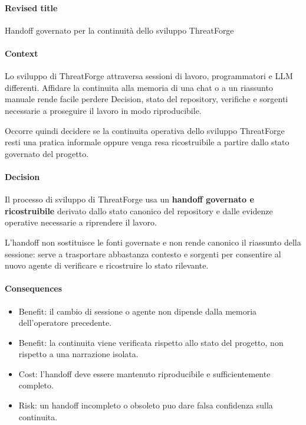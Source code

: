 \documentclass[
  10pt,
]{article}
\providecommand{\tightlist}{%
  \setlength{\itemsep}{0pt}\setlength{\parskip}{0pt}}
\begin{document}
\paragraph{Revised title}\label{revised-title-4}

Handoff governato per la continuità dello sviluppo ThreatForge

\paragraph{Context}\label{context-9}

Lo sviluppo di ThreatForge attraversa sessioni di lavoro, programmatori
e LLM differenti. Affidare la continuita alla memoria di una chat o a un
riassunto manuale rende facile perdere Decision, stato del repository,
verifiche e sorgenti necessarie a proseguire il lavoro in modo
riproducibile.

Occorre quindi decidere se la continuita operativa dello sviluppo
ThreatForge resti una pratica informale oppure venga resa ricostruibile
a partire dallo stato governato del progetto.

\paragraph{Decision}\label{decision-9}

Il processo di sviluppo di ThreatForge usa un \textbf{handoff governato
e ricostruibile} derivato dallo stato canonico del repository e dalle
evidenze operative necessarie a riprendere il lavoro.

L'handoff non sostituisce le fonti governate e non rende canonico il
riassunto della sessione: serve a trasportare abbastanza contesto e
sorgenti per consentire al nuovo agente di verificare e ricostruire lo
stato rilevante.

\paragraph{Consequences}\label{consequences-9}

\begin{itemize}
\tightlist
\item
  Benefit: il cambio di sessione o agente non dipende dalla memoria
  dell'operatore precedente.
\item
  Benefit: la continuita viene verificata rispetto allo stato del
  progetto, non rispetto a una narrazione isolata.
\item
  Cost: l'handoff deve essere mantenuto riproducibile e sufficientemente
  completo.
\item
  Risk: un handoff incompleto o obsoleto puo dare falsa confidenza sulla
  continuita.
\end{itemize}
\end{document}

